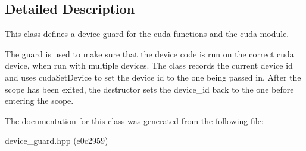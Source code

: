 \subsection{Detailed Description}
This class defines a device guard for the cuda functions and the cuda module. 

The guard is used to make sure that the device code is run on the correct cuda device, when run with multiple devices. The class records the current device id and uses {\ttfamily cuda\+Set\+Device} to set the device id to the one being passed in. After the scope has been exited, the destructor sets the device\+\_\+id back to the one before entering the scope. 

The documentation for this class was generated from the following file\+:\begin{DoxyCompactItemize}
\item 
device\+\_\+guard.\+hpp (e0c2959)\end{DoxyCompactItemize}
